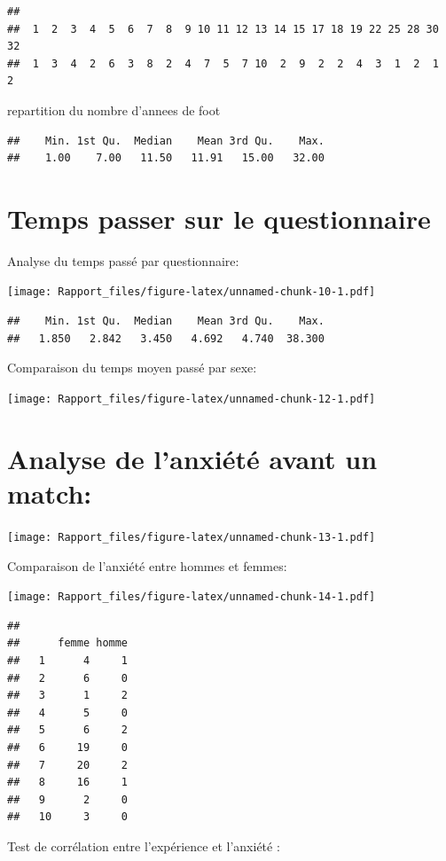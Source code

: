 \documentclass[
]{article}
\begin{document}
\begin{verbatim}
## 
##  1  2  3  4  5  6  7  8  9 10 11 12 13 14 15 17 18 19 22 25 28 30 32 
##  1  3  4  2  6  3  8  2  4  7  5  7 10  2  9  2  2  4  3  1  2  1  2
\end{verbatim}

repartition du nombre d'annees de foot

\begin{verbatim}
##    Min. 1st Qu.  Median    Mean 3rd Qu.    Max. 
##    1.00    7.00   11.50   11.91   15.00   32.00
\end{verbatim}

\section{Temps passer sur le
questionnaire}\label{temps-passer-sur-le-questionnaire}

Analyse du temps passé par questionnaire:

\texttt{[image: Rapport\_files/figure-latex/unnamed-chunk-10-1.pdf]}

\begin{verbatim}
##    Min. 1st Qu.  Median    Mean 3rd Qu.    Max. 
##   1.850   2.842   3.450   4.692   4.740  38.300
\end{verbatim}

Comparaison du temps moyen passé par sexe:

\texttt{[image: Rapport\_files/figure-latex/unnamed-chunk-12-1.pdf]}

\section{Analyse de l'anxiété avant un
match:}\label{analyse-de-lanxiuxe9tuxe9-avant-un-match}

\texttt{[image: Rapport\_files/figure-latex/unnamed-chunk-13-1.pdf]}

Comparaison de l'anxiété entre hommes et femmes:

\texttt{[image: Rapport\_files/figure-latex/unnamed-chunk-14-1.pdf]}

\begin{verbatim}
##     
##      femme homme
##   1      4     1
##   2      6     0
##   3      1     2
##   4      5     0
##   5      6     2
##   6     19     0
##   7     20     2
##   8     16     1
##   9      2     0
##   10     3     0
\end{verbatim}

Test de corrélation entre l'expérience et l'anxiété :
\end{document}
